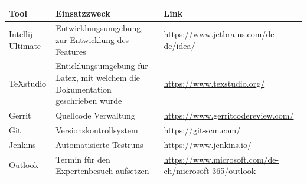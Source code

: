 \renewcommand{\arraystretch}{1.5}
\begin{longtable}{|p{}|p{}|p{}|}
    \hline
    \textbf{Tool} & \textbf{Einsatzzweck} & \textbf{Link} \\ \hline
    Intellij Ultimate           & Entwicklungsumgebung, zur Entwicklung des Features                   & \url{https://www.jetbrains.com/de-de/idea/}     \\ \hline
    TeXstudio           & Enticklungsumgebung für Latex, mit welchem die Dokumentation geschrieben wurde & \url{https://www.texstudio.org/}     \\ \hline
    Gerrit           & Quellcode Verwaltung & \url{https://www.gerritcodereview.com/}     \\ \hline
    Git          & Versionskontrollsystem & \url{https://git-scm.com/}     \\ \hline
    Jenkins & Automatisierte Testruns  & \url{https://www.jenkins.io/}     \\ \hline
    Outlook & Termin für den Expertenbesuch aufsetzen & \url{https://www.microsoft.com/de-ch/microsoft-365/outlook} \\ \hline
    
\end{longtable}
\renewcommand{\arraystretch}{1}
\newpage